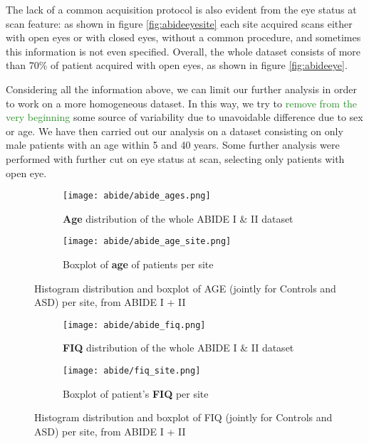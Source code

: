 \documentclass[11pt]{report}
\begin{document}
The lack of a common acquisition protocol is also evident from the eye status at scan feature: as shown in figure \ref{fig:abideeyesite} each site acquired scans either with open eyes or with closed eyes, without a common procedure, and sometimes this information is not even specified.
Overall, the whole dataset consists of more than 70\% of patient acquired with open eyes, as shown in figure \ref{fig:abideeye}.

Considering all the information above, we can limit our further analysis in order to work on a more homogeneous dataset. In this way, we try to \textcolor{ForestGreen}{remove from the very beginning} some source of variability due to unavoidable difference due to sex or age.
We have then carried out our analysis on a dataset consisting on only male patients with an age within 5 and 40 years. Some further analysis were performed with further cut on eye status at scan, selecting only patients with open eye.




\begin{figure}
\centering
\begin{subfigure}{0.5\textwidth}
\texttt{[image: abide/abide\_ages.png]}
\caption{\textbf{Age} distribution of the whole ABIDE I \& II dataset}
\label{fig:abideages}
\end{subfigure}

\begin{subfigure}{0.9\textwidth}
\texttt{[image: abide/abide\_age\_site.png]}
\caption{Boxplot of \textbf{age} of patients per site}
\label{fig:abide_age_site}
\end{subfigure}
\caption{Histogram distribution and boxplot of AGE (jointly for Controls and ASD) per site, from ABIDE I + II}
\label{}
\end{figure}






\begin{figure}
\centering
\begin{subfigure}{0.5\textwidth}
\texttt{[image: abide/abide\_fiq.png]}
\caption{\textbf{FIQ} distribution of the whole ABIDE I \& II dataset}
\label{fig:abidefiq}
\end{subfigure}
\begin{subfigure}{0.9\textwidth}
\texttt{[image: abide/fiq\_site.png]}
\caption{Boxplot of patient's \textbf{FIQ} per site}
\label{fig:abide_fiq_site}
\end{subfigure}
\caption{Histogram distribution and boxplot of FIQ (jointly for Controls and ASD) per site, from ABIDE I + II}
\label{}
\end{figure}
\end{document}
